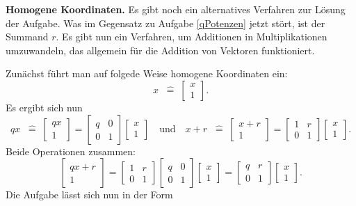 \documentclass[a4paper,10pt,fleqn,twoside]{scrartcl}
\numberwithin{equation}{section}
\newcommand{\strong}[1]{{\normalfont\sffamily\bfseries #1}}
\newcommand{\entspricht}{\;\;\hat =\;}
\theoremstyle{Aufgabe}
\begin{document}
\strong{Homogene Koordinaten.}
Es gibt noch ein alternatives Verfahren zur Lösung der Aufgabe.
Was im Gegensatz zu Aufgabe \ref{qPotenzen}
jetzt stört, ist der Summand $r$. Es gibt nun ein Verfahren, um
Additionen in Multiplikationen umzuwandeln, das allgemein für die
Addition von Vektoren funktioniert.

Zunächst führt man auf folgede Weise homogene Koordinaten ein:
\[ x\entspricht\begin{bmatrix}x\\ 1\end{bmatrix}.\]
Es ergibt sich nun
\[ qx\entspricht\begin{bmatrix}qx\\ 1\end{bmatrix}
= \begin{bmatrix}
q & 0\\
0 & 1
\end{bmatrix}
\begin{bmatrix}x\\ 1\end{bmatrix}
\quad\text{und}\quad
x+r\entspricht\begin{bmatrix}x+r\\ 1\end{bmatrix}
= \begin{bmatrix}
1 & r\\
0 & 1
\end{bmatrix}
\begin{bmatrix}x\\ 1\end{bmatrix}.\]
Beide Operationen zusammen:
\[\begin{bmatrix}qx+r\\ 1\end{bmatrix}
= \begin{bmatrix}
1 & r\\
0 & 1
\end{bmatrix}
\begin{bmatrix}
q & 0\\
0 & 1
\end{bmatrix}
\begin{bmatrix}x\\ 1\end{bmatrix}
= \begin{bmatrix}
q & r\\
0 & 1
\end{bmatrix}
\begin{bmatrix}x\\ 1\end{bmatrix}.\]
Die Aufgabe lässt sich nun in der Form
\end{document}
